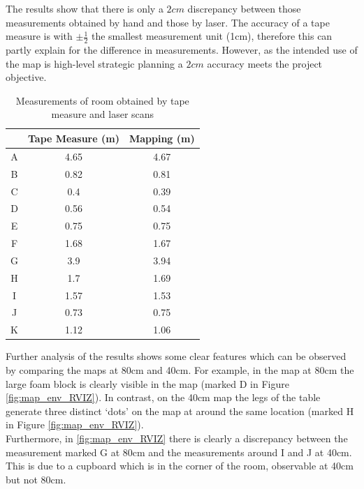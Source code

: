 \documentclass[capstone_report.tex]{subfiles}
\begin{document}
The results show that there is only a $2cm$ discrepancy between those measurements obtained by hand and those by laser.  The accuracy of a tape measure is with $\pm \frac{1}{2}$ the smallest measurement unit (1cm), therefore this can partly explain for the difference in measurements.  However, as the intended use of the map is high-level strategic planning a $2cm$ accuracy meets the project objective. \\

\begin{table}[H]
\centering
\begin{tabular}{@{}|ccc|@{}}
\toprule
&Tape Measure (m) & Mapping (m)       \\ \midrule
A            & 4.65    & 4.67 \\
B            & 0.82    & 0.81 \\
C            & 0.4     & 0.39 \\
D            & 0.56    & 0.54 \\
E            & 0.75    & 0.75 \\
F            & 1.68    & 1.67 \\
G            & 3.9     & 3.94 \\
H            & 1.7     & 1.69 \\
I            & 1.57    & 1.53 \\
J            & 0.73    & 0.75 \\
K            & 1.12    & 1.06 \\ \bottomrule
\end{tabular}
\caption{Measurements of room obtained by tape measure and laser scans}
\label{table:measure}
\end{table}

Further analysis of the results shows some clear features which can be observed by comparing the maps at 80cm and 40cm. For example, in the map at 80cm the large foam block is clearly visible in the map (marked D in Figure \ref{fig:map_env_RVIZ}). In contrast, on the 40cm map the legs of the table generate three distinct `dots' on the map at around the same location (marked H in Figure \ref{fig:map_env_RVIZ}).\\

Furthermore, in \ref{fig:map_env_RVIZ} there is clearly a discrepancy between the measurement marked G at 80cm and the measurements around I and J at 40cm. This is due to a cupboard which is in the corner of the room, observable at 40cm but not 80cm.\\
\end{document}
